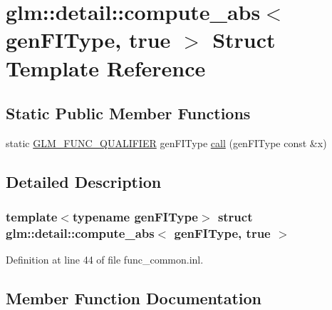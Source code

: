 \hypertarget{structglm_1_1detail_1_1compute__abs_3_01gen_f_i_type_00_01true_01_4}{}\section{glm\+:\+:detail\+:\+:compute\+\_\+abs$<$ gen\+F\+I\+Type, true $>$ Struct Template Reference}
\label{structglm_1_1detail_1_1compute__abs_3_01gen_f_i_type_00_01true_01_4}
\subsection*{Static Public Member Functions}
\begin{DoxyCompactItemize}
\item 
static \hyperlink{setup_8hpp_a33fdea6f91c5f834105f7415e2a64407}{G\+L\+M\+\_\+\+F\+U\+N\+C\+\_\+\+Q\+U\+A\+L\+I\+F\+I\+ER} gen\+F\+I\+Type \hyperlink{structglm_1_1detail_1_1compute__abs_3_01gen_f_i_type_00_01true_01_4_a13dee7b421d52969e40d8cdef020d0be}{call} (gen\+F\+I\+Type const \&x)
\end{DoxyCompactItemize}


\subsection{Detailed Description}
\subsubsection*{template$<$typename gen\+F\+I\+Type$>$\newline
struct glm\+::detail\+::compute\+\_\+abs$<$ gen\+F\+I\+Type, true $>$}



Definition at line 44 of file func\+\_\+common.\+inl.



\subsection{Member Function Documentation}
\mbox{\label{structglm_1_1detail_1_1compute__abs_3_01gen_f_i_type_00_01true_01_4_a13dee7b421d52969e40d8cdef020d0be}} 
